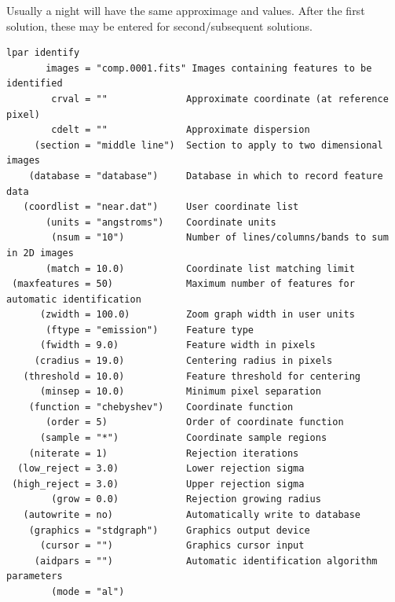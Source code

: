 Usually a night will have the same approximage  and
 values.  After the first solution, these may be entered
for second/subsequent solutions.
\clearpage
\begingroup \fontsize{10pt}{10pt}
\selectfont
\begin{verbatim} 
lpar identify
       images = "comp.0001.fits" Images containing features to be identified
        crval = ""              Approximate coordinate (at reference pixel)
        cdelt = ""              Approximate dispersion
     (section = "middle line")  Section to apply to two dimensional images
    (database = "database")     Database in which to record feature data
   (coordlist = "near.dat")     User coordinate list
       (units = "angstroms")    Coordinate units
        (nsum = "10")           Number of lines/columns/bands to sum in 2D images
       (match = 10.0)           Coordinate list matching limit
 (maxfeatures = 50)             Maximum number of features for automatic identification
      (zwidth = 100.0)          Zoom graph width in user units
       (ftype = "emission")     Feature type
      (fwidth = 9.0)            Feature width in pixels
     (cradius = 19.0)           Centering radius in pixels
   (threshold = 10.0)           Feature threshold for centering
      (minsep = 10.0)           Minimum pixel separation
    (function = "chebyshev")    Coordinate function
       (order = 5)              Order of coordinate function
      (sample = "*")            Coordinate sample regions
    (niterate = 1)              Rejection iterations
  (low_reject = 3.0)            Lower rejection sigma
 (high_reject = 3.0)            Upper rejection sigma
        (grow = 0.0)            Rejection growing radius
   (autowrite = no)             Automatically write to database
    (graphics = "stdgraph")     Graphics output device
      (cursor = "")             Graphics cursor input
     (aidpars = "")             Automatic identification algorithm parameters
        (mode = "al")           
\end{verbatim}
\endgroup
